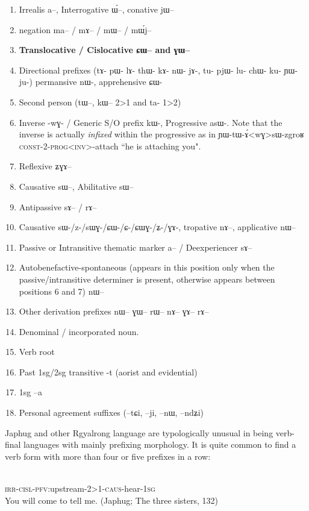 \documentclass[oldfontcommands,oneside,a4paper,11pt]{article}
\newcommand{\ipa}[1]{{\phon #1}} %
\newcommand{\caus}{\textsc{caus}}
\newcommand{\const}{\textsc{const}}
\newcommand{\inv}{\textsc{inv}}
\newcommand{\irr}{\textsc{irr}}
\newcommand{\pfv}{\textsc{pfv}}
\newcommand{\sg}{\textsc{sg}}
\newcommand{\cisloc}{\textsc{cisl}}
\begin{document}
\begin{landscape}
\begin{multicols}{2}
\begin{enumerate}
\item Irrealis  \ipa{a}--, Interrogative \ipa{ɯ́}--, conative \ipa{jɯ}--
\item negation \ipa{ma}-- / \ipa{mɤ}-- / \ipa{mɯ}-- / \ipa{mɯ́j}--
\item \textbf{Translocative / Cislocative \ipa{ɕɯ}-- and \ipa{ɣɯ}--}
\item Directional prefixes (tɤ- pɯ- lɤ- thɯ- kɤ- nɯ- jɤ-, tu- pjɯ- lu- chɯ- ku- ɲɯ- ju-) permansive nɯ-, apprehensive ɕɯ-
\item Second person (\ipa{tɯ}--, \ipa{kɯ}-- 2>1 and ta- 1>2)
\item Inverse -\ipa{wɣ}- / Generic S/O prefix \ipa{kɯ}-, Progressive \ipa{asɯ}-. Note that the inverse is actually \textit{infixed} within the progressive as in \ipa{ɲɯ-tɯ-ɤ́<wɣ>sɯ-zgroʁ} \const{}-2-\textsc{prog}<\inv{}>-attach ``he is attaching you". 
\item Reflexive \ipa{ʑɣɤ}-- 
\item Causative \ipa{sɯ}--, Abilitative \ipa{sɯ}--
\item  Antipassive  \ipa{sɤ}-- / \ipa{rɤ}--
\item Causative sɯ-/z-/sɯɣ-/ɕɯ-/ɕ-/ɕɯɣ-/ʑ-/ɣɤ-, tropative \ipa{nɤ}--, applicative \ipa{nɯ}--
\item Passive or Intransitive thematic marker \ipa{a}-- / Deexperiencer \ipa{sɤ}--
\item Autobenefactive-spontaneous (appears in this position only when the passive/intransitive determiner is present, otherwise appears between positions 6 and 7) \ipa{nɯ}--
\item Other derivation prefixes \ipa{nɯ}-- \ipa{ɣɯ}-- \ipa{rɯ}-- \ipa{nɤ}-- \ipa{ɣɤ}-- \ipa{rɤ}--
\item Denominal / incorporated noun.  
\item Verb root 
\item Past 1sg/2sg transitive -\ipa{t} (aorist and evidential)
\item 1sg --\ipa{a}
\item Personal agreement suffixes (--\ipa{tɕi}, --\ipa{ji}, --\ipa{nɯ}, --\ipa{ndʑi})
\end{enumerate}


\end{multicols}
  \end{landscape}
Japhug and other Rgyalrong language are typologically unusual in being verb-final languages with mainly prefixing morphology. It is quite common to find a verb form with more than four or five prefixes in a row:
\begin{exe}
\ex
\gll \ipa{a-ɣɯ-lɤ-kɯ-sɯ-mtsʰam-a	}    \\
  \irr{}-\cisloc{}-\pfv{}:upstream-2>1-\caus{}-hear-1\sg{}   \\
 \glt  You will come  to tell me. (Japhug; The three sisters, 132)

\end{exe}  
 
\end{document}
